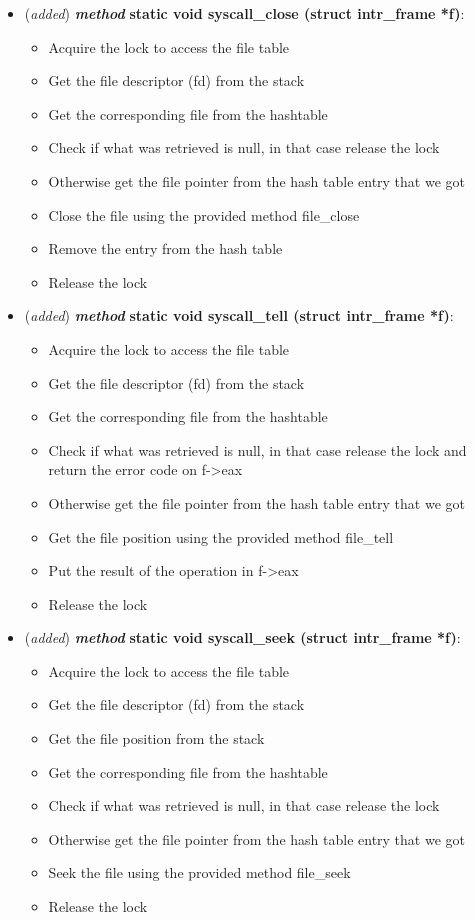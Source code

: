 \documentclass[11pt]{scrartcl}
\begin{document}
\begin{itemize}
    \item (\textit{added}) \textbf{\textit{method}} \textbf{static void
syscall\_close (struct intr\_frame *f)}:
\begin{itemize}
    \item[] Acquire the lock to access the file table 
    \item[] Get the file descriptor (fd) from the stack
    \item[] Get the corresponding file from the hashtable
    \item[] Check if what was retrieved is null, in that case release the lock
    \item[] Otherwise get the file pointer from the hash table entry that we got
    \item[] Close the file using the provided method file\_close
    \item[] Remove the entry from the hash table
    \item[] Release the lock
\end{itemize}

    \item (\textit{added}) \textbf{\textit{method}} \textbf{static void
syscall\_tell (struct intr\_frame *f)}:
\begin{itemize}
    \item[] Acquire the lock to access the file table 
    \item[] Get the file descriptor (fd) from the stack
    \item[] Get the corresponding file from the hashtable
    \item[] Check if what was retrieved is null, in that case release the lock and return the error code on f->eax
    \item[] Otherwise get the file pointer from the hash table entry that we got
    \item[] Get the file position using the provided method file\_tell
    \item[] Put the result of the operation in f->eax 
    \item[] Release the lock
\end{itemize}

    \item (\textit{added}) \textbf{\textit{method}} \textbf{static void
syscall\_seek (struct intr\_frame *f)}:
\begin{itemize}
    \item[] Acquire the lock to access the file table 
    \item[] Get the file descriptor (fd) from the stack
    \item[] Get the file position from the stack
    \item[] Get the corresponding file from the hashtable
    \item[] Check if what was retrieved is null, in that case release the lock 
    \item[] Otherwise get the file pointer from the hash table entry that we got
    \item[] Seek the file using the provided method file\_seek
    \item[] Release the lock
\end{itemize}


\end{itemize}
\end{document}

